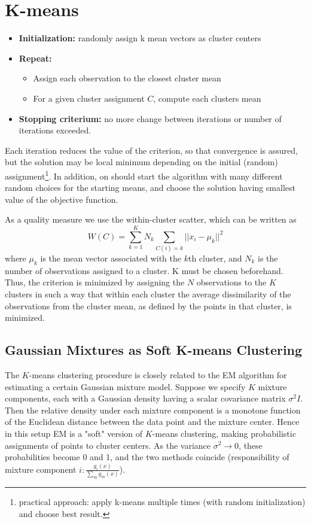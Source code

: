 
\section*{K-means}

\begin{itemize}
	\item \textbf{Initialization:} randomly assign k mean vectors as cluster centers
	\item \textbf{Repeat:} 
		\begin{itemize}
			\item Assign each observation to the closest cluster mean
			\item For a given cluster assignment \(C\), compute each clusters mean
		\end{itemize}
	\item \textbf{Stopping criterium:} no more change between iterations or number of iterations exceeded.
\end{itemize}

Each iteration reduces the value of the criterion, so that convergence is assured, but the solution may be local minimum depending on the initial (random) assignment\footnote{practical approach: apply k-means multiple times (with random initialization) and choose best result.}. In addition, on should start the algorithm with many different random choices for the starting means, and choose the solution having smallest value of the objective function.

As a quality measure we use the within-cluster scatter, which can be written as
\begin{equation*}
	W(C) = \sum_{k=1}^K N_k \sum_{C(i) = k} ||x_i - \mu_k||^2
\end{equation*}
where \(\mu_k\) is the mean vector associated with the \(k\)th cluster, and \(N_k\) is the number of observations assigned to a cluster. K must be chosen beforehand. Thus, the criterion is minimized by assigning the \(N\) observations to the \(K\) clusters in such a way that within each cluster the average dissimilarity of the observations from the cluster mean, as defined by the points in that cluster, is minimized.



\subsection*{Gaussian Mixtures as Soft K-means Clustering}
The \(K\)-means clustering procedure is closely related to the EM algorithm for estimating a certain Gaussian mixture model. Suppose we specify \(K\) mixture components, each with a Gaussian density having a scalar covariance matrix \(\sigma^2 I\). Then the relative density under each mixture component is a monotone function of the Euclidean distance between the data point and the mixture center. Hence in this setup EM is a "soft" version of \(K\)-means clustering, making probabilistic assignments of points to cluster centers. As the variance \(\sigma^2 \rightarrow 0\), these probabilities become 0 and 1, and the two methods coincide (responsibility of mixture component \(i: \frac{g_i(x)}{\sum_m g_m(x)}\)).

